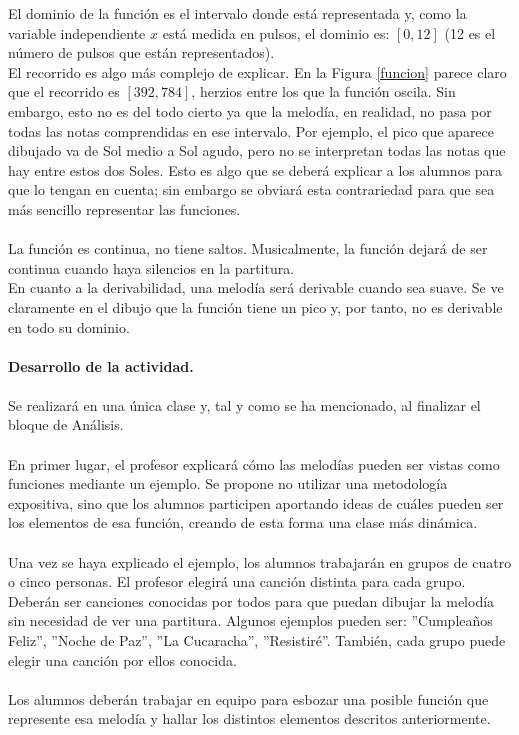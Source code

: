 \documentclass[a4paper, openright, 11pt, titlepage]{report}
\theoremstyle{definition}\newtheorem{defin}[propo]{Definition}
\theoremstyle{definition}\newtheorem{obser}[propo]{Remark}
\theoremstyle{definition}\newtheorem{ejem}[propo]{Ejemplo}
\theoremstyle{definition}\newtheorem{algoritmo}[propo]{Algoritmo}
\begin{document}
El dominio de la función es el intervalo donde está representada y, como la variable independiente $x$ está medida en pulsos, el dominio es: $[0, 12]$ (12 es el número de pulsos que están representados).\\
El recorrido es algo más complejo de explicar. En la Figura \ref{funcion} parece claro que el recorrido es $[392, 784]$, herzios entre los que la función oscila. Sin embargo, esto no es del todo cierto ya que la melodía, en realidad, no pasa por todas las notas comprendidas en ese intervalo. Por ejemplo, el pico que aparece dibujado va de Sol medio a Sol agudo, pero no se interpretan todas las notas que hay entre estos dos Soles. Esto es algo que se deberá explicar a los alumnos para que lo tengan en cuenta; sin embargo se obviará esta contrariedad para que sea más sencillo representar las funciones.\\\\
La función es continua, no tiene saltos. Musicalmente, la función dejará de ser continua cuando haya silencios en la partitura.\\
En cuanto a la derivabilidad, una melodía será derivable cuando sea suave. Se ve claramente en el dibujo que la función tiene un pico y, por tanto, no es derivable en todo su dominio.\\\\
\textbf{Desarrollo de la actividad.}\\\\
Se realizará en una única clase y, tal y como se ha mencionado, al finalizar el bloque de Análisis.\\\\
En primer lugar, el profesor explicará cómo las melodías pueden ser vistas como funciones mediante un ejemplo. Se propone no utilizar una metodología expositiva, sino que los alumnos participen aportando ideas de cuáles pueden ser los elementos de esa función, creando de esta forma una clase más dinámica.\\\\
Una vez se haya explicado el ejemplo, los alumnos trabajarán en grupos de cuatro o cinco personas. El profesor elegirá una canción distinta para cada grupo. Deberán ser canciones conocidas por todos para que puedan dibujar la melodía sin necesidad de ver una partitura. Algunos ejemplos pueden ser: ''Cumpleaños Feliz'', ''Noche de Paz'', ''La Cucaracha'', ''Resistiré''. También, cada grupo puede elegir una canción por ellos conocida.\\\\
Los alumnos deberán trabajar en equipo para esbozar una posible función que represente esa melodía y hallar los distintos elementos descritos anteriormente. 
\end{document}

